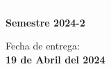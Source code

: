 \begin{titlepage}
\vspace{20mm}

\begin{minipage}{0.4\textwidth}
    \textcolor{white}{Semestre}\\
    \large\textbf{Semestre 2024-2}      
\end{minipage}
\begin{minipage}{0.4\textwidth}
    \begin{flushright}
        {\large Fecha de entrega:\\
         \textbf{19 de Abril del 2024}}
    \end{flushright}
\end{minipage}

\makeatother

\vfill 
\end{titlepage}
